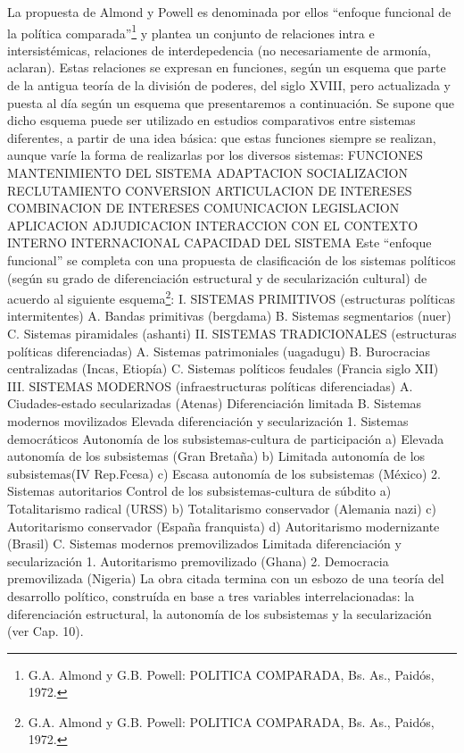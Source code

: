 \documentclass[
]{book}
\begin{document}
La propuesta de Almond y Powell es denominada por ellos ``enfoque funcional de la política comparada''\footnote{G.A. Almond y G.B. Powell: POLITICA COMPARADA, Bs. As., Paidós, 1972.} y plantea un conjunto de relaciones intra e intersistémicas, relaciones de interdepedencia (no necesariamente de armonía, aclaran). Estas relaciones se expresan en funciones, según un esquema que parte de la antigua teoría de la división de poderes, del siglo XVIII, pero actualizada y puesta al día según un esquema que presentaremos a continuación. Se supone que dicho esquema puede ser utilizado en estudios comparativos entre sistemas diferentes, a partir de una idea básica: que estas funciones siempre se realizan, aunque varíe la forma de realizarlas por los diversos sistemas: FUNCIONES \textbar{} MANTENIMIENTO DEL SISTEMA \textbar{} \textbar{} ADAPTACION \textbar{} SOCIALIZACION \textbar{} \textbar{} RECLUTAMIENTO \textbar{} \textbar{} CONVERSION \textbar{} ARTICULACION DE INTERESES \textbar{} \textbar{} COMBINACION DE INTERESES \textbar{} \textbar{} COMUNICACION \textbar{} \textbar{} LEGISLACION \textbar{} \textbar{} APLICACION \textbar{} \textbar{} ADJUDICACION \textbar{} \textbar{} INTERACCION CON EL CONTEXTO \textbar{} INTERNO \textbar{} \textbar{} INTERNACIONAL \textbar{} CAPACIDAD DEL SISTEMA Este ``enfoque funcional'' se completa con una propuesta de clasificación de los sistemas políticos (según su grado de diferenciación estructural y de secularización cultural) de acuerdo al siguiente esquema\footnote{G.A. Almond y G.B. Powell: POLITICA COMPARADA, Bs. As., Paidós, 1972.}: I. SISTEMAS PRIMITIVOS (estructuras políticas intermitentes) A. Bandas primitivas (bergdama) B. Sistemas segmentarios (nuer) C. Sistemas piramidales (ashanti) II. SISTEMAS TRADICIONALES (estructuras políticas diferenciadas) A. Sistemas patrimoniales (uagadugu) B. Burocracias centralizadas (Incas, Etiopía) C. Sistemas políticos feudales (Francia siglo XII) III. SISTEMAS MODERNOS (infraestructuras políticas diferenciadas) A. Ciudades-estado secularizadas (Atenas) Diferenciación limitada B. Sistemas modernos movilizados Elevada diferenciación y secularización 1. Sistemas democráticos Autonomía de los subsistemas-cultura de participación a) Elevada autonomía de los subsistemas (Gran Bretaña) b) Limitada autonomía de los subsistemas(IV Rep.Fcesa) c) Escasa autonomía de los subsistemas (México) 2. Sistemas autoritarios Control de los subsistemas-cultura de súbdito a) Totalitarismo radical (URSS) b) Totalitarismo conservador (Alemania nazi) c) Autoritarismo conservador (España franquista) d) Autoritarismo modernizante (Brasil) C. Sistemas modernos premovilizados Limitada diferenciación y secularización 1. Autoritarismo premovilizado (Ghana) 2. Democracia premovilizada (Nigeria) La obra citada termina con un esbozo de una teoría del desarrollo político, construída en base a tres variables interrelacionadas: la diferenciación estructural, la autonomía de los subsistemas y la secularización (ver Cap. 10).
\end{document}
